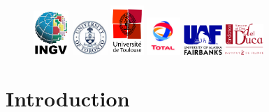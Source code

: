 \documentclass[oneside,english,onecolumn,letterpaper]{book}
\begin{document}
\begin{figure}[htbp]
\begin{center}
\includegraphics[width=0.119\textwidth]{figures/logo_INGV}
\includegraphics[width=0.119\textwidth]{figures/logo_University_of_Toronto}
\includegraphics[width=0.112\textwidth]{figures/logo_Univ_Toulouse}
\includegraphics[width=0.112\textwidth]{figures/logo_TOTAL}
\includegraphics[width=0.130\textwidth]{figures/logo_Fairbanks}
\hspace*{3mm}\includegraphics[width=0.130\textwidth]{figures/logo_fondation_Del_Duca}
\end{center}
\end{figure}

\newpage

\tableofcontents


\chapter{Introduction}

\end{document}
